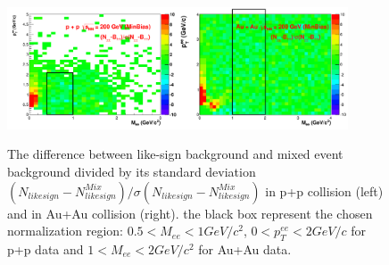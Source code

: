\begin{figure}
\begin{centering}
\includegraphics[width=0.45\textwidth]{fig/3.Analysis/background/pp/paper_nRegion}\includegraphics[width=0.45\textwidth]{fig/3.Analysis/background/AuAu/paper_nRegion}
\par\end{centering}

\protect\caption{The difference between like-sign background and mixed event background
divided by its standard deviation $(N_{likesign}-N_{likesign}^{Mix})/\sigma(N_{likesign}-N_{likesign}^{Mix})$
in p+p collision (left) and in Au+Au collision (right). the black
box represent the chosen normalization region: $0.5<M_{ee}<1GeV/c^{2}$,
$0<p_{T}^{ee}<2GeV/c$ for p+p data and $1<M_{ee}<2GeV/c^{2}$ for
Au+Au data.}


\label{fig:norRegion}
\end{figure}


